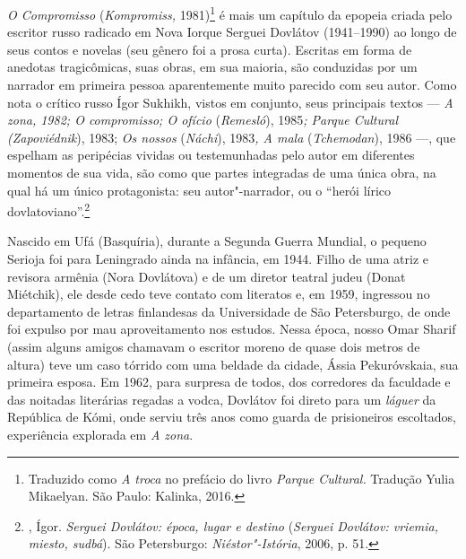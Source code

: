 \clearpage
\thispagestyle{empty}

\movetoevenpage
\pagebreak
\begin{center}
{}
\end{center}
\label{posfacio}

\bigskip

\emph{O Compromisso} (\emph{Kompromiss,} 1981)\footnote{Traduzido como
  \emph{A troca} no prefácio do livro \emph{Parque Cultural.} Tradução
  Yulia Mikaelyan. São Paulo: Kalinka, 2016.} é mais um capítulo da
epopeia criada pelo escritor russo radicado em Nova Iorque Serguei
Dovlátov (1941--1990) ao longo de seus contos e novelas (seu gênero foi
a prosa curta). Escritas em forma de anedotas tragicômicas, suas obras,
em sua maioria, são conduzidas por um narrador em primeira pessoa
aparentemente muito parecido com seu autor. Como nota o crítico russo
Ígor Sukhikh, vistos em conjunto, seus principais textos --- \emph{A
zona, 1982; O compromisso; O ofício} (\emph{Remesló}),
1985\emph{; Parque Cultural (Zapoviédnik}), 1983; \emph{Os
nossos} (\emph{Náchi}), 1983\emph{, A mala}
(\emph{Tchemodan}), 1986 ---, que espelham as peripécias vividas
ou testemunhadas pelo autor em diferentes momentos de sua vida, são como
que partes integradas de uma única obra, na qual há um único
protagonista: seu autor"-narrador, ou o ``herói lírico
dovlatoviano''.\footnote{, Ígor. \emph{Serguei Dovlátov: época,
  lugar e destino} (\emph{Serguei Dovlátov: vriemia, miesto, sudbá}). São
  Petersburgo: \emph{Niéstor"-Istória}, 2006, p. 51.}

Nascido em Ufá (Basquíria), durante a Segunda Guerra Mundial, o pequeno
Serioja foi para Leningrado ainda na infância, em 1944. Filho de uma
atriz e revisora armênia (Nora Dovlátova) e de um diretor teatral judeu (Donat Miétchik), ele desde cedo
teve contato com literatos e, em 1959, ingressou no departamento de
letras finlandesas da Universidade de São Petersburgo, de onde foi
expulso por mau aproveitamento nos estudos. Nessa época, nosso Omar
Sharif (assim alguns amigos chamavam o escritor moreno de quase dois
metros de altura) teve um caso tórrido com uma beldade da cidade, Ássia
Pekuróvskaia, sua primeira esposa. Em 1962, para surpresa de todos, dos
corredores da faculdade e das noitadas literárias regadas a vodca,
Dovlátov foi direto para um \emph{láguer} da República de Kómi, onde
serviu três anos como guarda de prisioneiros escoltados, experiência
explorada em \emph{A zona}.

